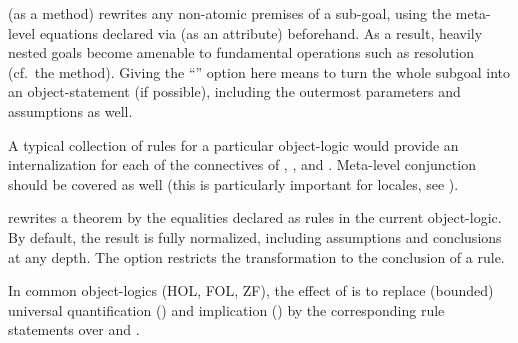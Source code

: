 \begin{isabellebody}
\begin{isamarkuptext}
\begin{description}
  \item \hyperlink{method.atomize}{\mbox{}} (as a method) rewrites any non-atomic
  premises of a sub-goal, using the meta-level equations declared via
  \hyperlink{attribute.atomize}{\mbox{}} (as an attribute) beforehand.  As a result,
  heavily nested goals become amenable to fundamental operations such
  as resolution (cf.\ the \hyperlink{method.Pure.rule}{\mbox{}} method).  Giving the ``'' option here means to turn the whole subgoal into an
  object-statement (if possible), including the outermost parameters
  and assumptions as well.

  A typical collection of \hyperlink{attribute.atomize}{\mbox{}} rules for a particular
  object-logic would provide an internalization for each of the
  connectives of , , and .
  Meta-level conjunction should be covered as well (this is
  particularly important for locales, see ).

  \item \hyperlink{attribute.rule-format}{\mbox{}} rewrites a theorem by the equalities
  declared as \hyperlink{attribute.rulify}{\mbox{}} rules in the current object-logic.
  By default, the result is fully normalized, including assumptions
  and conclusions at any depth.  The  option
  restricts the transformation to the conclusion of a rule.

  In common object-logics (HOL, FOL, ZF), the effect of \hyperlink{attribute.rule-format}{\mbox{}} is to replace (bounded) universal quantification
  () and implication () by the corresponding
  rule statements over  and .


\end{description}
\end{isamarkuptext}
\end{isabellebody}
